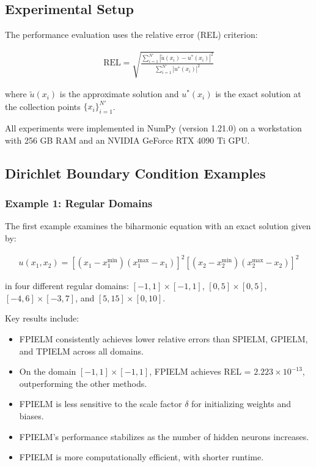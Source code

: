 \documentclass[11pt]{article}
\begin{document}
\subsection{Experimental Setup}

The performance evaluation uses the relative error (REL) criterion:

\begin{align}
    \text{REL} = \sqrt{\frac{\sum_{i=1}^{N'} |\tilde{u}(x_i) - u^*(x_i)|^2}{\sum_{i=1}^{N'} |u^*(x_i)|^2}}
\end{align}

where $\tilde{u}(x_i)$ is the approximate solution and $u^*(x_i)$ is the exact solution at the collection points $\{x_i\}_{i=1}^{N'}$.

All experiments were implemented in NumPy (version 1.21.0) on a workstation with 256 GB RAM and an NVIDIA GeForce RTX 4090 Ti GPU.

\subsection{Dirichlet Boundary Condition Examples}

\subsubsection{Example 1: Regular Domains}

The first example examines the biharmonic equation with an exact solution given by:

\begin{align}
    u(x_1, x_2) = [(x_1 - x_1^{\min})(x_1^{\max} - x_1)]^2[(x_2 - x_2^{\min})(x_2^{\max} - x_2)]^2
\end{align}

in four different regular domains: $[-1,1] \times [-1,1]$, $[0,5] \times [0,5]$, $[-4,6] \times [-3,7]$, and $[5,15] \times [0,10]$.

Key results include:
\begin{itemize}
    \item FPIELM consistently achieves lower relative errors than SPIELM, GPIELM, and TPIELM across all domains.
    \item On the domain $[-1,1] \times [-1,1]$, FPIELM achieves REL = $2.223 \times 10^{-13}$, outperforming the other methods.
    \item FPIELM is less sensitive to the scale factor $\delta$ for initializing weights and biases.
    \item FPIELM's performance stabilizes as the number of hidden neurons increases.
    \item FPIELM is more computationally efficient, with shorter runtime.
\end{itemize}
\end{document}
